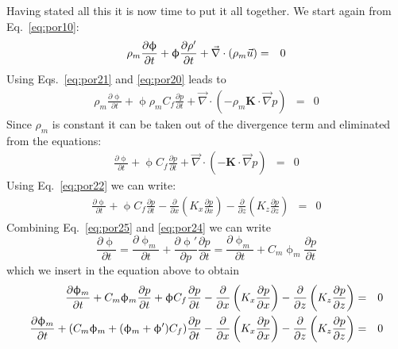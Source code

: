 Having stated all this it is now time to put it all together.
We start again from Eq.~\eqref{eq:por10}:
\begin{eqnarray}
\rho_m \frac{\partial \upphi}{\partial t} 
+\upphi \frac{\partial \rho' }{\partial t} 
+ \vec\nabla\cdot (\rho_m \vec{u}) &=& 0 \nonumber
\end{eqnarray}
Using Eqs.~\eqref{eq:por21} and \eqref{eq:por20} leads to
\begin{eqnarray}
\rho_m \frac{\partial \upphi}{\partial t} 
+\upphi \rho_m C_f \frac{\partial p}{\partial t} 
+ \vec\nabla\cdot (- \rho_m {\bm K} \cdot \vec\nabla p) &=& 0 
\end{eqnarray}
Since $\rho_m$ is constant it can be taken out of the divergence term 
and eliminated from the equations:
\begin{eqnarray}
 \frac{\partial \upphi}{\partial t} 
+\upphi  C_f \frac{\partial p}{\partial t} 
+ \vec\nabla\cdot (- {\bm K} \cdot \vec\nabla p) &=& 0 
\end{eqnarray}
Using Eq.~\eqref{eq:por22} we can write:
\begin{eqnarray}
\frac{\partial \upphi}{\partial t} 
+\upphi  C_f \frac{\partial p}{\partial t} 
- \frac{\partial}{\partial x} \left( K_x \frac{\partial p}{\partial x} \right) 
- \frac{\partial}{\partial z} \left( K_z \frac{\partial p}{\partial z} \right) 
&=& 0 
\end{eqnarray}
Combining Eq.~\eqref{eq:por25} and \eqref{eq:por24} we can write
\[
\frac{\partial \upphi}{\partial t}
=\frac{\partial \upphi_m}{\partial t} +\frac{\partial \upphi'}{\partial p} \frac{\partial p}{\partial t}
=\frac{\partial \upphi_m}{\partial t} + C_m \upphi_m \frac{\partial p}{\partial t}
\]
which we insert in the equation above to obtain
\begin{eqnarray}
\frac{\partial \upphi_m}{\partial t} + C_m \upphi_m \frac{\partial p}{\partial t}
+\upphi  C_f \frac{\partial p}{\partial t} 
- \frac{\partial}{\partial x} \left( K_x \frac{\partial p}{\partial x} \right) 
- \frac{\partial}{\partial z} \left( K_z \frac{\partial p}{\partial z} \right) 
&=& 0 \nonumber\\
\frac{\partial \upphi_m}{\partial t} 
+ (C_m \upphi_m 
+ (\upphi_m+\upphi' ) C_f )\frac{\partial p}{\partial t} 
- \frac{\partial}{\partial x} \left( K_x \frac{\partial p}{\partial x} \right) 
- \frac{\partial}{\partial z} \left( K_z \frac{\partial p}{\partial z} \right) 
&=& 0 
\end{eqnarray}
